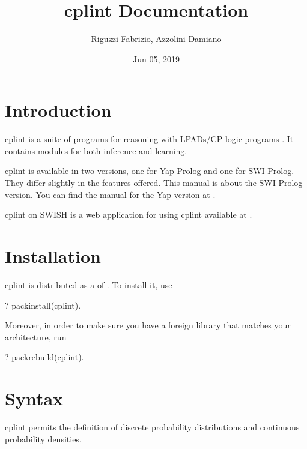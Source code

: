 \documentclass[letterpaper,10pt,english]{sphinxmanual}
\title{cplint Documentation}
\date{Jun 05, 2019}
\author{Riguzzi Fabrizio, Azzolini Damiano}
\begin{document}
\pagestyle{empty}
\sphinxmaketitle
\pagestyle{plain}
\sphinxtableofcontents
\pagestyle{normal}
\label{\detokenize{index::doc}}



\chapter{Introduction}
\label{\detokenize{index:introduction}}
cplint is a suite of programs for reasoning with LPADs/CP-logic programs .
It contains modules for both inference and learning.

cplint is available in two versions, one for Yap Prolog and one for SWI-Prolog.
They differ slightly in the features offered.
This manual is about the SWI-Prolog version.
You can find the manual for the Yap version at .

cplint on SWISH is a web application for using cplint available at .


\chapter{Installation}
\label{\detokenize{index:installation}}
cplint is distributed as a  of .
To install it, use

\begin{sphinxVerbatim}[commandchars=\\\{\}]
?\PYGZhy{} pack\PYGZus{}install(cplint).
\end{sphinxVerbatim}

Moreover, in order to make sure you have a foreign library that matches your architecture, run

\begin{sphinxVerbatim}[commandchars=\\\{\}]
?\PYGZhy{} pack\PYGZus{}rebuild(cplint).
\end{sphinxVerbatim}


\chapter{Syntax}
\label{\detokenize{index:syntax}}
cplint permits the definition of discrete probability distributions and continuous probability densities.
\end{document}
